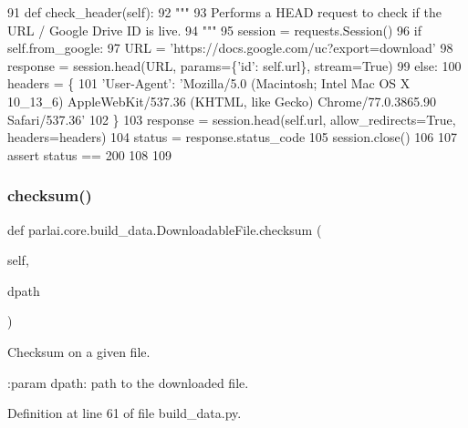 \begin{DoxyCode}
91     \textcolor{keyword}{def }check\_header(self):
92         \textcolor{stringliteral}{"""}
93 \textcolor{stringliteral}{        Performs a HEAD request to check if the URL / Google Drive ID is live.}
94 \textcolor{stringliteral}{        """}
95         session = requests.Session()
96         \textcolor{keywordflow}{if} self.from\_google:
97             URL = \textcolor{stringliteral}{'https://docs.google.com/uc?export=download'}
98             response = session.head(URL, params=\{\textcolor{stringliteral}{'id'}: self.url\}, stream=\textcolor{keyword}{True})
99         \textcolor{keywordflow}{else}:
100             headers = \{
101                 \textcolor{stringliteral}{'User-Agent'}: \textcolor{stringliteral}{'Mozilla/5.0 (Macintosh; Intel Mac OS X 10\_13\_6) AppleWebKit/537.36 (KHTML,
       like Gecko) Chrome/77.0.3865.90 Safari/537.36'}
102             \}
103             response = session.head(self.url, allow\_redirects=\textcolor{keyword}{True}, headers=headers)
104         status = response.status\_code
105         session.close()
106 
107         \textcolor{keyword}{assert} status == 200
108 
109 
\end{DoxyCode}
\mbox{\label{classparlai_1_1core_1_1build__data_1_1DownloadableFile_aa69730e15f7f4a535e01e126ceb87f9d}} 
\subsubsection{\texorpdfstring{checksum()}{checksum()}}
{\footnotesize\ttfamily def parlai.\+core.\+build\+\_\+data.\+Downloadable\+File.\+checksum (\begin{DoxyParamCaption}\item[{}]{self,  }\item[{}]{dpath }\end{DoxyParamCaption})}

\begin{DoxyVerb}Checksum on a given file.

:param dpath: path to the downloaded file.
\end{DoxyVerb}
 

Definition at line 61 of file build\+\_\+data.\+py.


